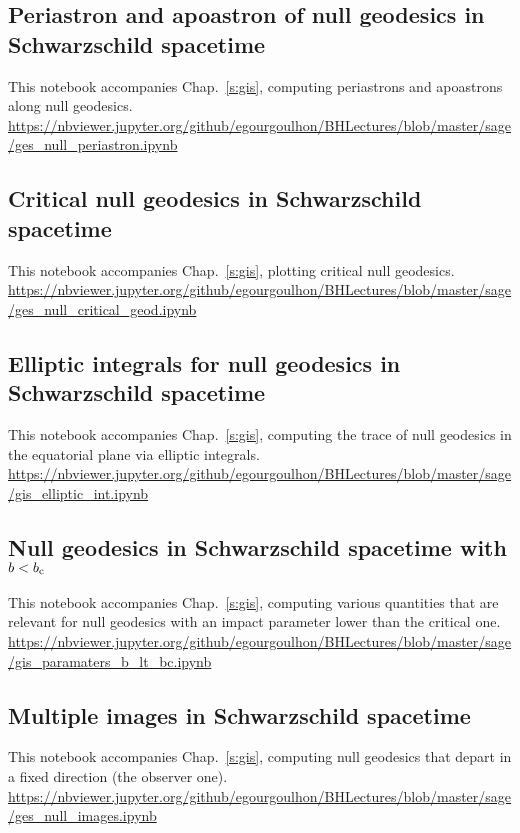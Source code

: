 \subsection{Periastron and apoastron of null geodesics in Schwarzschild spacetime} \label{s:sam:ges_null_periastron}
%
This notebook accompanies Chap.~\ref{s:gis}, computing periastrons and apoastrons
along null geodesics.\\[1ex]
{\footnotesize
\url{https://nbviewer.jupyter.org/github/egourgoulhon/BHLectures/blob/master/sage/ges_null_periastron.ipynb}
}

\subsection{Critical null geodesics in Schwarzschild spacetime} \label{s:sam:ges_null_critical_geod}
%
This notebook accompanies Chap.~\ref{s:gis}, plotting critical null geodesics.\\[1ex]
{\footnotesize
\url{https://nbviewer.jupyter.org/github/egourgoulhon/BHLectures/blob/master/sage/ges_null_critical_geod.ipynb}
}

\subsection{Elliptic integrals for null geodesics in Schwarzschild spacetime} \label{s:sam:gis_elliptic_int}
%
This notebook accompanies Chap.~\ref{s:gis}, computing the trace of null
geodesics in the equatorial plane via elliptic integrals.\\[1ex]
{\footnotesize
\url{https://nbviewer.jupyter.org/github/egourgoulhon/BHLectures/blob/master/sage/gis_elliptic_int.ipynb}
}

\subsection{Null geodesics in Schwarzschild spacetime with $b<b_{\rm c}$} \label{s:sam:gis_paramaters_b_lt_bc}
%
This notebook accompanies Chap.~\ref{s:gis}, computing various quantities that
are relevant for null geodesics with an impact parameter lower than the critical one.\\[1ex]
{\footnotesize
\url{https://nbviewer.jupyter.org/github/egourgoulhon/BHLectures/blob/master/sage/gis_paramaters_b_lt_bc.ipynb}
}

\subsection{Multiple images in Schwarzschild spacetime} \label{s:sam:ges_null_images}
%
This notebook accompanies Chap.~\ref{s:gis}, computing null geodesics that
depart in a fixed direction (the observer one).\\[1ex]
{\footnotesize
\url{https://nbviewer.jupyter.org/github/egourgoulhon/BHLectures/blob/master/sage/ges_null_images.ipynb}
}

